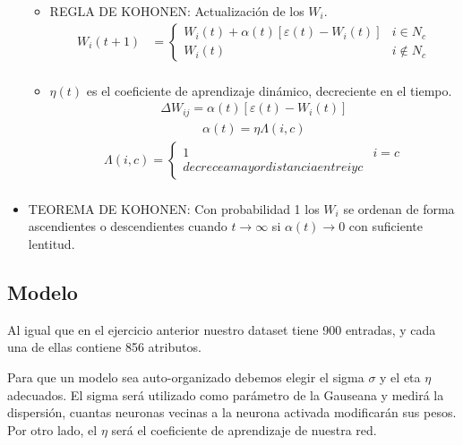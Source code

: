 \begin{itemize}
\begin{itemize}
			\item REGLA DE KOHONEN: Actualización de los $W_{i}$.
					\begin{align*}
					 W_{i}(t+1) &=  \begin{cases}
										W_{i}(t) + \alpha(t) [ \varepsilon(t) - W_{i}(t) ] & i \in N_{c} \\
										W_{i}(t)                                           & i \not \in N_{c}  
									\end{cases} \\
					\end{align*}
			\item $\eta(t)$ es el coeficiente de aprendizaje dinámico, decreciente en el tiempo.
				\begin{align*}
					\Delta W_{ij} = \alpha(t) [ \varepsilon(t) - W_{i}(t) ]
				\end{align*}
				\begin{align*}
					\alpha(t) = \eta \Lambda(i,c)
				\end{align*}
				\begin{align*}
					\Lambda(i,c) = \begin{cases}
										1 & i = c \\
										decrece a mayor distancia entre i y c 
									\end{cases} \\
				\end{align*}
		\end{itemize}
	\item TEOREMA DE KOHONEN: Con probabilidad 1 los $W_{i}$ se ordenan de forma ascendientes o descendientes cuando $t \to
		\infty$ si $\alpha(t) \to 0$ con suficiente lentitud.
\end{itemize}

\subsection{Modelo}

Al igual que en el ejercicio anterior nuestro dataset tiene 900 entradas, y cada una de ellas contiene 856 atributos.

Para que un modelo sea auto-organizado debemos elegir el sigma $\sigma$ y  el eta $\eta$ adecuados. El sigma será utilizado como parámetro de la Gauseana y medirá la dispersión, cuantas 
neuronas vecinas a la neurona activada modificarán sus pesos. Por otro lado, el $\eta$ será el coeficiente de aprendizaje de nuestra red.


